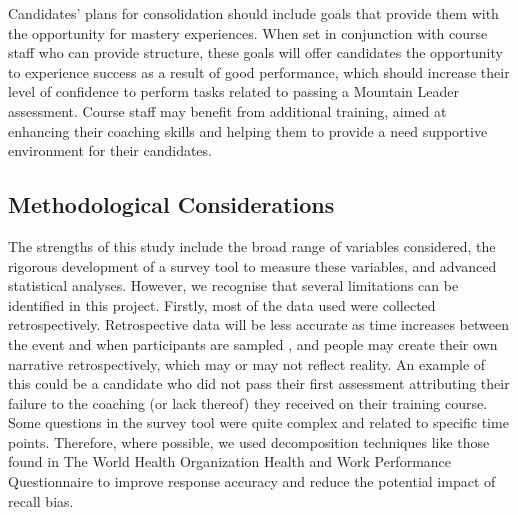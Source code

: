 \documentclass[
  12pt,
  a4paper,
]{book}
\begin{document}
Candidates' plans for consolidation should include goals that provide them with the opportunity for mastery experiences. When set in conjunction with course staff who can provide structure, these goals will offer candidates the opportunity to experience success as a result of good performance, which should increase their level of confidence to perform tasks related to passing a Mountain Leader assessment. Course staff may benefit from additional training, aimed at enhancing their coaching skills and helping them to provide a need supportive environment for their candidates.

\hypertarget{methodological-considerations}{%
\subsection{Methodological Considerations}\label{methodological-considerations}}

The strengths of this study include the broad range of variables considered, the rigorous development of a survey tool to measure these variables, and advanced statistical analyses. However, we recognise that several limitations can be identified in this project. Firstly, most of the data used were collected retrospectively. Retrospective data will be less accurate as time increases between the event and when participants are sampled \citep{Hopwood2013}, and people may create their own narrative retrospectively, which may or may not reflect reality. An example of this could be a candidate who did not pass their first assessment attributing their failure to the coaching (or lack thereof) they received on their training course. Some questions in the survey tool were quite complex and related to specific time points. Therefore, where possible, we used decomposition techniques like those found in The World Health Organization Health and Work Performance Questionnaire \citep[HPQ;][]{Kessler2003a} to improve response accuracy and reduce the potential impact of recall bias.
\end{document}
